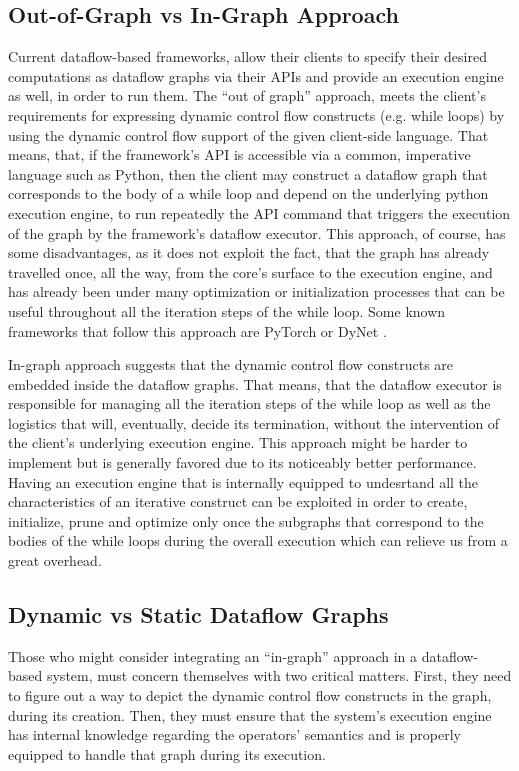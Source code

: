 \documentclass[ack,preface]{dithesis}
\begin{document}
    \subsection{Out-of-Graph vs In-Graph Approach}
Current dataflow-based frameworks, allow their clients to specify their desired computations as dataflow graphs via their APIs and provide an execution engine as well, in order to run them. The “out of graph” approach, meets the client’s requirements for expressing dynamic control flow constructs (e.g. while loops) by using the dynamic control flow support of the given client-side language. That means, that, if the framework’s API is accessible via a common, imperative language such as Python, then the client may construct a dataflow graph that corresponds to the body of a while loop and depend on the underlying python execution engine, to run repeatedly the API command that triggers the execution of the graph by the framework’s dataflow executor. This approach, of course, has some disadvantages, as it does not exploit the fact, that the graph has already travelled once, all the way, from the core’s surface to the execution engine, and has already been under many optimization or initialization processes that can be useful throughout all the iteration steps of the while loop.
Some known frameworks that follow this approach are  PyTorch \cite{Paszke2017} or DyNet  \cite{ Neubig2017DyNetTD}.

In-graph approach suggests that the dynamic control flow constructs are embedded inside the dataflow graphs. That means, that the dataflow executor is responsible for managing all the iteration steps of the while loop as well as the logistics that will, eventually, decide its termination, without the intervention of the client’s underlying execution engine.
This approach might be harder to implement but is generally favored due to its noticeably better performance.  \cite{Yu:2018} Having an execution engine that is internally equipped to undesrtand all the characteristics of an iterative construct can be exploited in order to create, initialize, prune and optimize only once the subgraphs that correspond to the bodies of  the while loops during the overall execution which can relieve us from a great overhead.

    \subsection{Dynamic vs Static Dataflow Graphs}
Those who might consider integrating an “in-graph” approach in a dataflow-based system, must concern themselves with two critical matters. First, they need to figure out a way to depict the dynamic control flow constructs in the graph, during its creation. Then, they must ensure that  the system’s execution engine has internal knowledge regarding the operators' semantics and is properly equipped to handle that graph during its execution.
\end{document}
